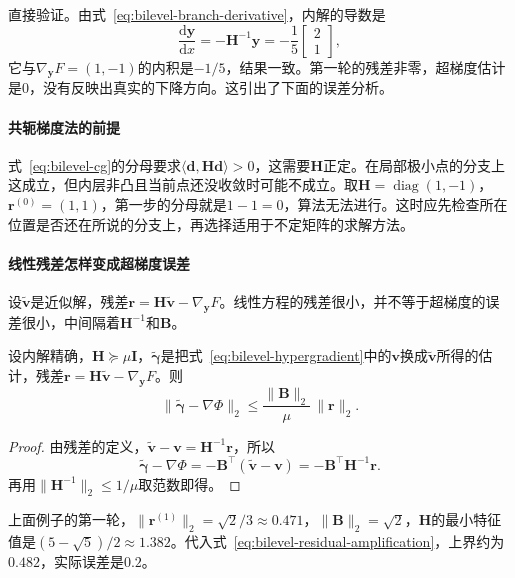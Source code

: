直接验证。由式~\eqref{eq:bilevel-branch-derivative}，内解的导数是
\[
 \frac{\mathrm{d}\bm{y}}{\mathrm{d}x}=-\bm{H}^{-1}\bm{y}=-\frac15\begin{bmatrix}2\\1\end{bmatrix},
\]
它与$\nabla_{\bm{y}}F=(1,-1)$的内积是$-1/5$，结果一致。第一轮的残差非零，超梯度估计是$0$，没有反映出真实的下降方向。这引出了下面的误差分析。

\paragraph{共轭梯度法的前提}
式~\eqref{eq:bilevel-cg}的分母要求$\langle\bm{d},\bm{H}\bm{d}\rangle>0$，这需要$\bm{H}$正定。在局部极小点的分支上这成立，但内层非凸且当前点还没收敛时可能不成立。取$\bm{H}=\operatorname{diag}(1,-1)$，$\bm{r}^{(0)}=(1,1)$，第一步的分母就是$1-1=0$，算法无法进行。这时应先检查所在位置是否还在所说的分支上，再选择适用于不定矩阵的求解方法。

\paragraph{线性残差怎样变成超梯度误差}
设$\tilde{\bm{v}}$是近似解，残差$\bm{r}=\bm{H}\tilde{\bm{v}}-\nabla_{\bm{y}}F$。线性方程的残差很小，并不等于超梯度的误差很小，中间隔着$\bm{H}^{-1}$和$\bm{B}$。

\begin{theorem}[伴随残差的放大]
\label{thm:bilevel-residual-amplification}
设内解精确，$\bm{H}\succeq\mu\bm{I}$，$\tilde{\bm{\gamma}}$是把式~\eqref{eq:bilevel-hypergradient}中的$\bm{v}$换成$\tilde{\bm{v}}$所得的估计，残差$\bm{r}=\bm{H}\tilde{\bm{v}}-\nabla_{\bm{y}}F$。则
\begin{equation}
 \lVert\tilde{\bm{\gamma}}-\nabla\Phi\rVert_2\leq\frac{\lVert\bm{B}\rVert_2}{\mu}\,\lVert\bm{r}\rVert_2.
 \label{eq:bilevel-residual-amplification}
\end{equation}
\end{theorem}

\begin{proof}
由残差的定义，$\tilde{\bm{v}}-\bm{v}=\bm{H}^{-1}\bm{r}$，所以
\[
 \tilde{\bm{\gamma}}-\nabla\Phi=-\bm{B}^{\top}(\tilde{\bm{v}}-\bm{v})=-\bm{B}^{\top}\bm{H}^{-1}\bm{r}.
\]
再用$\lVert\bm{H}^{-1}\rVert_2\leq1/\mu$取范数即得。
\end{proof}

上面例子的第一轮，$\lVert\bm{r}^{(1)}\rVert_2=\sqrt{2}/3\approx0.471$，$\lVert\bm{B}\rVert_2=\sqrt2$，$\bm{H}$的最小特征值是$(5-\sqrt5)/2\approx1.382$。代入式~\eqref{eq:bilevel-residual-amplification}，上界约为$0.482$，实际误差是$0.2$。

